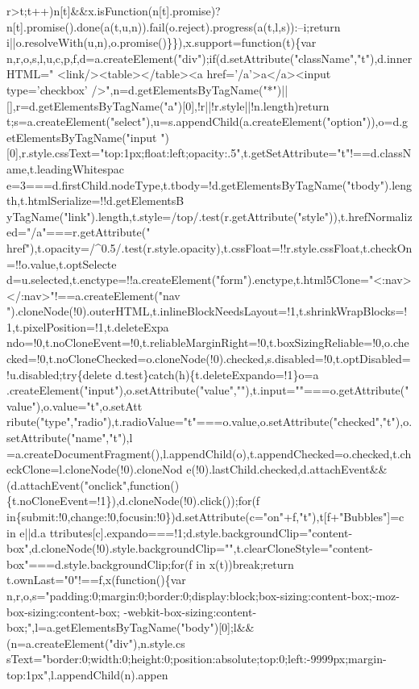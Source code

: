 \begin{DoxyCode}
{      r>t;t++)n[t]&&x.isFunction(n[t].promise)?n[t].promise().done(a(t,u,n)).fail(o.reject).progress(a(t,l,s)):--i;return i||o.resolveWith(u,n),o.promise()\}\}),x.support=function(t)\{var
       n,r,o,s,l,u,c,p,f,d=a.createElement("div");if(d.setAttribute("className","t"),d.innerHTML="  <link/><table></table><a href='}/a\textcolor{stringliteral}{'>a</a><input
       type='}checkbox\textcolor{stringliteral}{'
      />",n=d.getElementsByTagName("*")||[],r=d.getElementsByTagName("a")[0],!r||!r.style||!n.length)return
       t;s=a.createElement("select"),u=s.appendChild(a.createElement("option")),o=d.getElementsByTagName("input
      ")[0],r.style.cssText="top:1px;float:left;opacity:.5",t.getSetAttribute="t"!==d.className,t.leadingWhitespac
      e=3===d.firstChild.nodeType,t.tbody=!d.getElementsByTagName("tbody").length,t.htmlSerialize=!!d.getElementsB
      yTagName("link").length,t.style=/top/.test(r.getAttribute("style")),t.hrefNormalized="/a"===r.getAttribute("
      href"),t.opacity=/^0.5/.test(r.style.opacity),t.cssFloat=!!r.style.cssFloat,t.checkOn=!!o.value,t.optSelecte
      d=u.selected,t.enctype=!!a.createElement("form").enctype,t.html5Clone="<:nav></:nav>"!==a.createElement("nav
      ").cloneNode(!0).outerHTML,t.inlineBlockNeedsLayout=!1,t.shrinkWrapBlocks=!1,t.pixelPosition=!1,t.deleteExpa
      ndo=!0,t.noCloneEvent=!0,t.reliableMarginRight=!0,t.boxSizingReliable=!0,o.checked=!0,t.noCloneChecked=o.cloneNode(!0).checked,s.disabled=!0,t.optDisabled=!u.disabled;try\{delete
       d.test\}catch(h)\{t.deleteExpando=!1\}o=a
      .createElement("input"),o.setAttribute("value",""),t.input=""===o.getAttribute("value"),o.value="t",o.setAtt
      ribute("type","radio"),t.radioValue="t"===o.value,o.setAttribute("checked","t"),o.setAttribute("name","t"),l
      =a.createDocumentFragment(),l.appendChild(o),t.appendChecked=o.checked,t.checkClone=l.cloneNode(!0).cloneNod
      e(!0).lastChild.checked,d.attachEvent&&(d.attachEvent("onclick",function()\{t.noCloneEvent=!1\}),d.cloneNode(!0).click());for(f in\{submit:!0,change:!0,focusin:!0\})d.setAttribute(c="on"+f,"t"),t[f+"Bubbles"]=c in
       e||d.a
      ttributes[c].expando===!1;d.style.backgroundClip="content-box",d.cloneNode(!0).style.backgroundClip="",t.clearCloneStyle="content-box"===d.style.backgroundClip;for(f in x(t))break;return
       t.ownLast="0"!==f,x(function()\{var
       n,r,o,s="padding:0;margin:0;border:0;display:block;box-sizing:content-box;-moz-box-sizing:content-box;
      -webkit-box-sizing:content-box;",l=a.getElementsByTagName("body")[0];l&&(n=a.createElement("div"),n.style.cs
      sText="border:0;width:0;height:0;position:absolute;top:0;left:-9999px;margin-top:1px",l.appendChild(n).appen
}
\end{DoxyCode}
